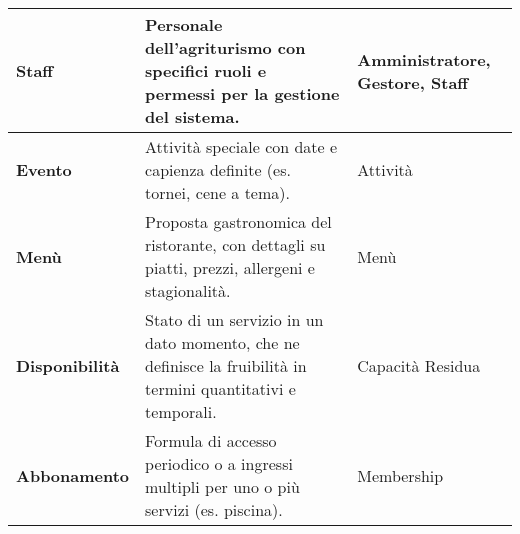 \documentclass[a4paper,11pt]{report}
\begin{document}
\begin{center}
\begin{tabularx}{\textwidth}{l >{\raggedright\arraybackslash}X l}
        \textbf{Staff} & Personale dell'agriturismo con specifici ruoli e permessi per la gestione del sistema. & Amministratore, Gestore, Staff \\
        \hline
        \textbf{Evento} & Attività speciale con date e capienza definite (es. tornei, cene a tema). & Attività \\
        \hline
        \textbf{Menù} & Proposta gastronomica del ristorante, con dettagli su piatti, prezzi, allergeni e stagionalità. & Menù \\
        \hline
        \textbf{Disponibilità} & Stato di un servizio in un dato momento, che ne definisce la fruibilità in termini quantitativi e temporali. & Capacità Residua \\
        \hline
        \textbf{Abbonamento} & Formula di accesso periodico o a ingressi multipli per uno o più servizi (es. piscina). & Membership \\
    \end{tabularx}
\end{center}
\end{document}
